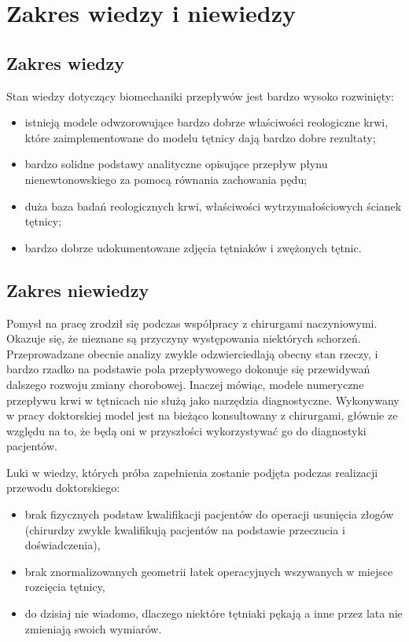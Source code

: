 \documentclass[11pt]{article} %
\begin{document}
\section{Zakres wiedzy i niewiedzy} %


\subsection{Zakres wiedzy} %

Stan wiedzy dotyczący biomechaniki przepływów jest bardzo wysoko rozwinięty:
\begin{itemize}
\item istnieją modele odwzorowujące bardzo dobrze właściwości reologiczne krwi, które zaimplementowane do modelu tętnicy dają bardzo dobre rezultaty;
\item bardzo solidne podstawy analityczne opisujące przepływ płynu nienewtonowskiego za pomocą równania zachowania pędu;
\item duża baza badań reologicznych krwi, właściwości wytrzymałościowych ścianek tętnicy;
\item bardzo dobrze udokumentowane zdjęcia tętniaków i zwężonych tętnic.
\end{itemize}



\subsection{Zakres niewiedzy} %

Pomysł na pracę zrodził się podczas współpracy z chirurgami naczyniowymi. Okazuje się, że nieznane są przyczyny występowania niektórych schorzeń. Przeprowadzane obecnie analizy zwykle odzwierciedlają obecny stan rzeczy, i bardzo rzadko na podstawie pola przepływowego dokonuje się przewidywań dalszego rozwoju zmiany chorobowej. Inaczej mówiąc, modele numeryczne przepływu krwi w tętnicach nie służą jako narzędzia diagnostyczne. Wykonywany w pracy doktorskiej model jest na bieżąco konsultowany z chirurgami, głównie ze względu na to, że będą oni w przyszłości wykorzystywać go do diagnostyki pacjentów.


Luki w wiedzy, których próba zapełnienia zostanie podjęta podczas realizacji przewodu doktorskiego:
\begin{itemize}
\item brak fizycznych podstaw kwalifikacji pacjentów do operacji usunięcia złogów (chirurdzy zwykle kwalifikują pacjentów na podstawie przeczucia i doświadczenia),
\item brak znormalizowanych geometrii łatek operacyjnych wszywanych w miejsce rozcięcia tętnicy,
\item do dzisiaj nie wiadomo, dlaczego niektóre tętniaki pękają a inne przez lata nie zmieniają swoich wymiarów. 
\end{itemize}
\end{document}
